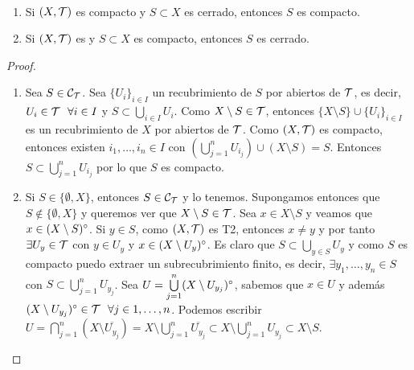 \begin{prop}\
    \begin{enumerate}
        \item[(i)] Si $(X, \mathcal{T})$ es compacto y $S\subset X$ es cerrado, entonces $S$ es compacto.
        \item[(ii)] Si $(X, \mathcal{T})$ es \apuntar{T2} y $S\subset X$ es compacto, entonces $S$ es cerrado.
    \end{enumerate}

    \begin{proof}\
        \begin{enumerate}
            \item[(i)] Sea $S\in \mathcal{C}_{\mathcal{T}}$. Sea $\{U_i\}_{i\in I}$ un recubrimiento de $S$ por abiertos de $\mathcal{T}$, es decir, $U_i\in \mathcal{T}\ \ \forall i \in I$ y $S\subset \bigcup\limits_{i\in I}U_i$. Como $X\setminus S\in \mathcal{T}$, entonces $\{X\setminus S\}\cup\{U_i\}_{i\in I}$ es un recubrimiento de $X$ por abiertos de $\mathcal{T}$. Como $(X, \mathcal{T})$ es compacto, entonces existen $i_1,\dots,i_n\in I$ con $\left(\bigcup\limits_{j=1}^{n}U_{i_j}\right)\cup (X\setminus S)=S$. Entonces $S\subset \bigcup\limits_{j=1}^{n}U_{i_j}$ por lo que $S$ es compacto.
            \item[(ii)] Si $S\in \{\emptyset, X\}$, entonces $S\in \mathcal{C}_{\mathcal{T}}$ y lo tenemos. Supongamos entonces que $S\notin \{\emptyset, X\}$ y queremos ver que $X\setminus S\in \mathcal{T}$. Sea $x\in X\setminus S$ y veamos que $x\in (X\setminus S)^\circ$. Si $y\in S$, como $(X, \mathcal{T})$ es T2, entonces $x\neq y$ y por tanto $\exists U_y\in \mathcal{T}$ con $y\in U_y$ y $x\in (X\setminus U_y)^\circ$. Es claro que $S\subset \bigcup\limits_{y\in S}U_y$ y como $S$ es compacto puedo extraer un subrecubrimiento finito, es decir, $\exists y_1, \dots, y_n\in S$ con $S\subset \bigcup\limits_{j=1}^{n}U_{y_j}$. Sea $U=\bigcup\limits_{j=1}^{n}(X\setminus U_{y_j})^\circ$, sabemos que $x\in U$ y además $(X\setminus U_{y_j})^\circ\in \mathcal{T}\ \ \forall j\in 1,\dots,n$. Podemos escribir $U=\bigcap\limits_{j=1}^{n}(X\setminus \overline{U_{y_j}})=X\setminus \bigcup\limits_{j=1}^n \overline{U_{y_j}}\subset X\setminus \bigcup\limits_{j=1}^n U_{y_j} \subset X\setminus S$.
        \end{enumerate}
    \end{proof}
\end{prop}

